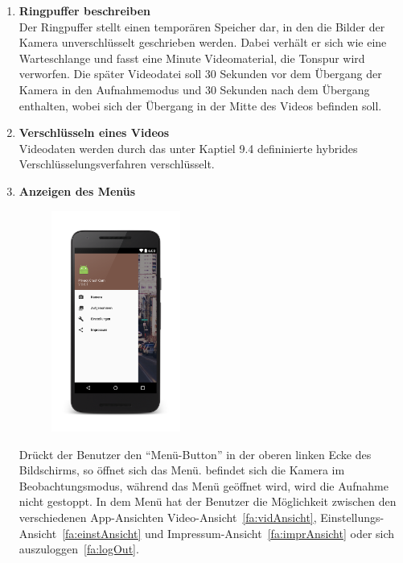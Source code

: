 \begin{enumerate}
\item \label{fa:Ringpuffer}\textbf{\gls{Ringpuffer} beschreiben} \hfill \\
Der Ringpuffer stellt einen temporären Speicher dar, in den die Bilder der Kamera unverschlüsselt geschrieben werden. Dabei verhält er sich wie eine Warteschlange und fasst eine Minute Videomaterial, die Tonspur wird verworfen. Die später  Videodatei soll 30 Sekunden vor dem Übergang der Kamera in den Aufnahmemodus und 30 Sekunden nach dem Übergang enthalten, wobei sich der Übergang in der Mitte des Videos befinden soll.

\item \label{fa:Verschluesselung}\textbf{Verschlüsseln eines Videos} \hfill \\
Videodaten werden durch das unter Kaptiel 9.4 defininierte hybrides Verschlüsselungsverfahren verschlüsselt.

\item \begin{minipage}[t]{\linewidth} 
\textbf{Anzeigen des Menüs} \hfill \\
	\begin{figure}
		\vspace{-70pt}
  		\begin{center}
   			\includegraphics[width=0.4\textwidth]{subtopicsFuncspec/Res/Mockups/Portrait_camera_view_menu_phone.png}
  		\end{center}
  		\vspace{-20pt}
  		\vspace{-10pt}
	\end{figure}
Drückt der Benutzer den ``Menü-Button'' in der oberen linken Ecke des Bildschirms, so öffnet sich das Menü. befindet sich die Kamera im Beobachtungsmodus, während das Menü geöffnet wird, wird die Aufnahme nicht gestoppt. In dem Menü hat der Benutzer die Möglichkeit zwischen den verschiedenen \gls{App}-Ansichten Video-Ansicht~\eqref{fa:vidAnsicht}, Einstellungs-Ansicht~\eqref{fa:einstAnsicht} und Impressum-Ansicht~\eqref{fa:imprAnsicht} oder sich auszuloggen~\eqref{fa:logOut}.


\end{minipage}
\end{enumerate}
